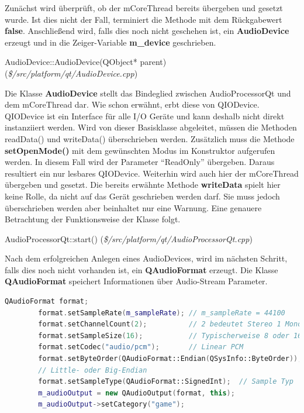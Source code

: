 \documentclass[11pt,a4paper]{scrartcl}
\begin{document}
Zun\"achst wird \"uberpr\"uft, ob der mCoreThread bereits \"ubergeben und gesetzt wurde. Ist dies nicht der Fall, terminiert die Methode mit dem R\"uckgabewert \textbf{false}. Anschlie{\ss}end wird, falls dies noch nicht geschehen ist, ein
\textbf{AudioDevice} erzeugt und in die Zeiger-Variable \textbf{m\_device} geschrieben.

\vspace{5mm}
\large AudioDevice::AudioDevice(QObject* parent) \normalsize(\textit{\$/src/platform/qt/AudioDevice.cpp})
\vspace{2mm}\newline

Die Klasse \textbf{AudioDevice} stellt das Bindeglied zwischen AudioProcessorQt und dem mCoreThread dar. Wie schon erw\"ahnt, erbt diese von QIODevice. QIODevice ist ein Interface f\"ur alle I/O Ger\"ate und kann deshalb nicht direkt instanziiert werden.
Wird von dieser Basisklasse abgeleitet, m\"ussen die Methoden readData() und writeData() \"uberschrieben werden. Zus\"atzlich muss die Methode \textbf{setOpenMode()} mit dem gew\"unschten Modus im Konstruktor aufgerufen werden. In diesem Fall wird der Parameter "`ReadOnly"' \"ubergeben. Daraus resultiert ein nur lesbares QIODevice. Weiterhin wird auch hier der mCoreThread \"ubergeben und gesetzt. Die bereits erw\"ahnte Methode \textbf{writeData} spielt hier keine Rolle, da nicht auf das Ger\"at geschrieben werden darf. Sie muss jedoch \"uberschrieben werden aber beinhaltet nur eine Warnung. Eine genauere Betrachtung der Funktionsweise der Klasse folgt. 



\vspace{5mm}
\large AudioProcessorQt::start() \normalsize(\textit{\$/src/platform/qt/AudioProcessorQt.cpp})
\vspace{2mm}\newline

Nach dem erfolgreichen Anlegen eines AudioDevices, wird im n\"achsten Schritt, falls dies noch nicht vorhanden ist, ein \textbf{QAudioFormat} erzeugt. Die Klasse \textbf{QAudioFormat} speichert Informationen \"uber Audio-Stream Parameter.

\vspace{5mm}
\begin{lstlisting}[language=C++, caption={Ausschnitt aus AudioProcessorQt::start()}, label={list:FormatAudioProcessorQt}]
    QAudioFormat format;
		format.setSampleRate(m_sampleRate); // m_sampleRate = 44100
		format.setChannelCount(2);			// 2 bedeutet Stereo 1 Mono
		format.setSampleSize(16);			// Typischerweise 8 oder 16
		format.setCodec("audio/pcm");		// Linear PCM
		format.setByteOrder(QAudioFormat::Endian(QSysInfo::ByteOrder));
		// Little- oder Big-Endian
		format.setSampleType(QAudioFormat::SignedInt);	// Sample Typ
		m_audioOutput = new QAudioOutput(format, this);
		m_audioOutput->setCategory("game");
\end{lstlisting}
  
\end{document}
